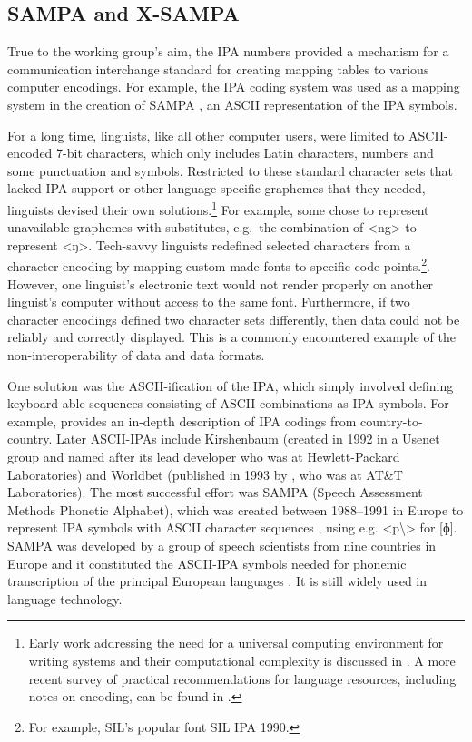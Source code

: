\subsection*{SAMPA and X-SAMPA}
\label{sampa-xsampa}

True to the working group's aim, the IPA numbers provided a mechanism for 
a communication interchange standard for creating mapping tables to various 
computer encodings. For example, the IPA coding system was used as a mapping 
system in the creation of SAMPA \citep{Wells_etal1992}, an ASCII representation 
of the IPA symbols. 

For a long time, linguists, like all other computer users, were
limited to ASCII-encoded 7-bit characters, which only includes Latin characters,
numbers and some punctuation and symbols. Restricted to these standard character
sets that lacked IPA support or other language-specific graphemes that they
needed, linguists devised their own solutions.\footnote{Early work addressing
the need for a universal computing environment for writing systems and their
computational complexity is discussed in \citet{Simons1989}. A more recent survey of
practical recommendations for language resources, including notes on encoding,
can be found in \citet{BirdSimons2003}.} For example, some chose to represent
unavailable graphemes with substitutes, e.g.~the combination of <ng> to
represent <ŋ>. Tech-savvy linguists redefined selected characters from a
character encoding by mapping custom made fonts to specific code points.\footnote{For 
example, SIL's popular font SIL IPA 1990.}. However,
one linguist's electronic text would not render properly on another linguist's
computer without access to the same font. Furthermore, if two character encodings
defined two character sets differently, then data could not be reliably and
correctly displayed. This is a commonly encountered example of the non-interoperability of
data and data formats.

One solution was the ASCII-ification of the IPA, which simply involved 
defining keyboard-able sequences consisting of ASCII combinations as IPA symbols. 
For example, \cite{Wells1987} provides an in-depth description of IPA
codings from country-to-country. Later ASCII-IPAs include Kirshenbaum (created
in 1992 in a Usenet group and named after its lead developer who was at
Hewlett-Packard Laboratories) and Worldbet (published in 1993 by
\cite{Hieronymus1993}, who was at AT\&T Laboratories). 
The most successful effort was SAMPA (Speech Assessment
Methods Phonetic Alphabet), which was created between 1988--1991 in Europe to 
represent IPA symbols with ASCII
character sequences \citep{Wells1987,Wells_etal1992}, using e.g. <p\textbackslash> 
for [ɸ]. SAMPA was developed by a group of speech scientists from nine countries 
in Europe and it constituted the ASCII-IPA symbols needed for phonemic transcription 
of the principal European languages \citep{Wells1995}. It is still widely 
used in language technology.

